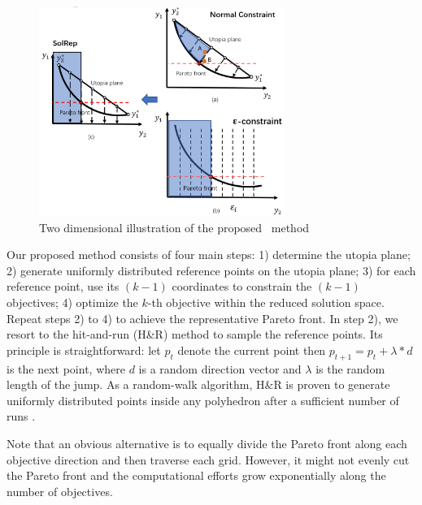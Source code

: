 \begin{figure}[t]
\vspace{-1mm}
\centering
\includegraphics[width=8cm]{image/uhre.png}
\vspace{-3mm}
\caption{Two dimensional illustration of the proposed \ourSol~method}
\label{fig:uhre}
\end{figure}

Our proposed method consists of four main steps: 1) determine the utopia plane; 2) generate uniformly distributed reference points on the utopia plane; 3) for each reference point, use its $(k-1)$ coordinates to constrain the $(k-1)$ objectives; 4) optimize the $k$-th objective within the reduced solution space. Repeat steps 2) to 4) to achieve the representative Pareto front. In step 2), we resort to the hit-and-run (H\&R) method \cite{DBLP:journals/ior/Smith84} to sample the reference points.
Its principle is straightforward: let $p_{t}$ denote the current point then $p_{t+1} = p_{t} + \lambda*d$ is the next point, where $d$ is a random direction vector and $\lambda$ is the random length of the jump. As a random-walk algorithm, H\&R is proven to generate uniformly distributed points inside any polyhedron after a sufficient number of runs \cite{DBLP:journals/ior/Smith84}.

Note that an obvious alternative is to equally divide the Pareto front along each objective direction and then traverse each grid. However, it might not evenly cut the Pareto front and the computational efforts grow exponentially along the number of objectives.


